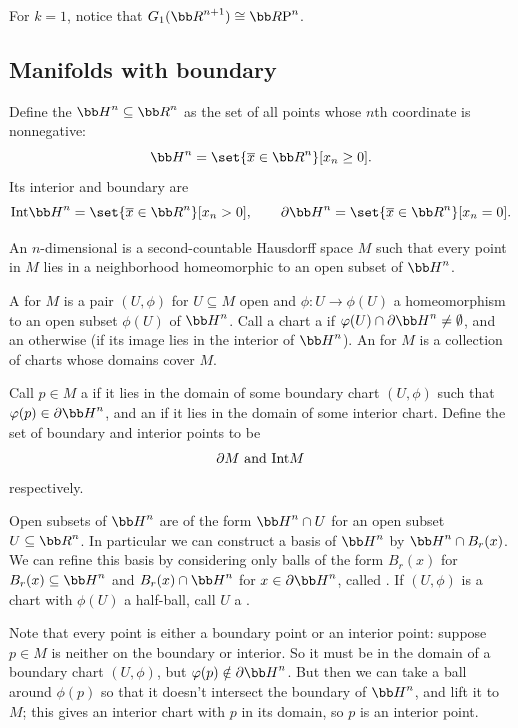     For $k=1$, notice that $G_1(\bR^{n+1})\cong\RP^n$.

\eexam

\subsection{Manifolds with boundary}

Define the  $\bH^n\subseteq\bR^n$ as the set of all points whose $n$th coordinate is
nonnegative:
$$ \bH^n = \set{\bar x\in\bR^n}[x_n\geq0] . $$
Its interior and boundary are
$$ \Int\bH^n = \set{\bar x\in\bR^n}[x_n>0],\qquad \partial\bH^n = \set{\bar x\in\bR^n}[x_n=0] . $$

\bdefn

    An $n$-dimensional  is a second-countable Hausdorff space $M$ such that every
    point in $M$ lies in a neighborhood homeomorphic to an open subset of $\bH^n$.

    A  for $M$ is a pair $(U,\phi)$ for $U\subseteq M$ open and $\phi\colon U\to\phi(U)$ a homeomorphism to an open subset $\phi(U)$
    of $\bH^n$.
    Call a chart a  if $\phi(U)\cap\partial\bH^n\neq\emptyset$, and an  otherwise
    (if its image lies in the interior of $\bH^n$).
    An  for $M$ is a collection of charts whose domains cover $M$.

    Call $p\in M$ a  if it lies in the domain of some boundary chart $(U,\phi)$ such that $\phi(p)\in\partial\bH^n$, and
    an  if it lies in the domain of some interior chart.
    Define the set of boundary and interior points to be
    $$ \partial M\hbox{ and }{\rm Int} M $$
    respectively.

\edefn

Open subsets of $\bH^n$ are of the form $\bH^n\cap U$ for an open subset $U\subseteq\bR^n$.
In particular we can construct a basis of $\bH^n$ by $\bH^n\cap B_r(x)$.
We can refine this basis by considering only balls of the form $B_r(x)$ for $B_r(x)\subseteq\bH^n$ and $B_r(x)\cap\bH^n$ for $x\in\partial\bH^n$,
called .
If $(U,\phi)$ is a chart with $\phi(U)$ a half-ball, call $U$ a .

Note that every point is either a boundary point or an interior point: suppose $p\in M$ is neither on the boundary or interior.
So it must be in the domain of a boundary chart $(U,\phi)$, but $\phi(p)\notin\partial\bH^n$.
But then we can take a ball around $\phi(p)$ so that it doesn't intersect the boundary of $\bH^n$, and lift it to $M$; this gives an interior
chart with $p$ in its domain, so $p$ is an interior point.

